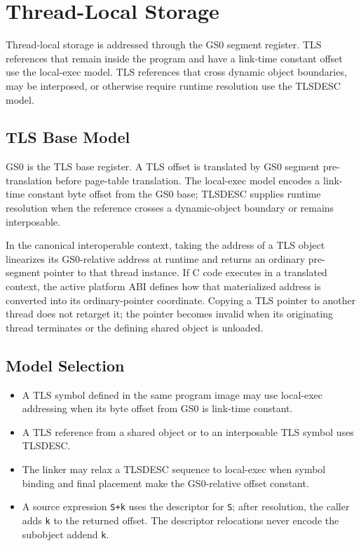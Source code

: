 \documentclass[10pt,twoside]{article}
\begin{document}
\section{Thread-Local Storage}\label{page:thread-local-storage}
Thread-local storage is addressed through the GS0 segment register. TLS references that remain inside the program and have a link-time constant offset use the local-exec model. TLS references that cross dynamic object boundaries, may be interposed, or otherwise require runtime resolution use the TLSDESC model.
\subsection{TLS Base Model}
GS0 is the TLS base register. A TLS offset is translated by GS0 segment
pre-translation before page-table translation. The local-exec model encodes a
link-time constant byte offset from the GS0 base; TLSDESC supplies runtime
resolution when the reference crosses a dynamic-object boundary or remains
interposable.



In the canonical interoperable context, taking the address of a TLS object
linearizes its GS0-relative address at runtime and returns an ordinary
pre-segment pointer to that thread instance. If C code executes in a translated
context, the active platform ABI defines how that materialized address is
converted into its ordinary-pointer coordinate. Copying a TLS pointer to
another thread does not retarget it; the pointer becomes invalid when its
originating thread terminates or the defining shared object is unloaded.
\subsection{Model Selection}
\begin{itemize}
\item A TLS symbol defined in the same program image may use local-exec addressing when its byte offset from GS0 is link-time constant.
\item A TLS reference from a shared object or to an interposable TLS symbol uses TLSDESC.
\item The linker may relax a TLSDESC sequence to local-exec when symbol binding and final placement make the GS0-relative offset constant.
\item A source expression \texttt{S+k} uses the descriptor for \texttt{S}; after resolution, the caller adds \texttt{k} to the returned offset. The descriptor relocations never encode the subobject addend \texttt{k}.
\end{itemize}
\Needspace{1.8in}
\end{document}
